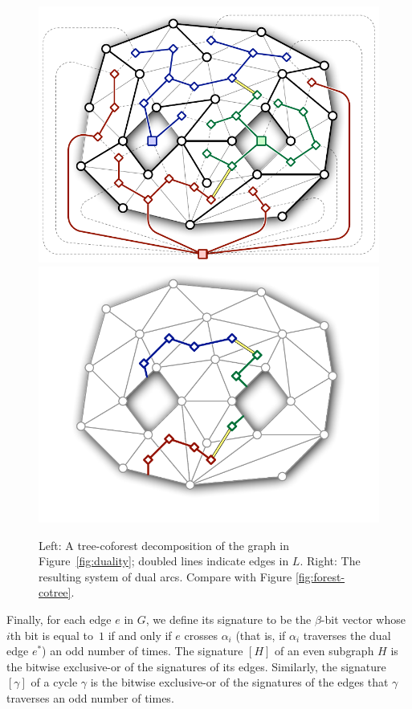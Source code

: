 \documentclass[11pt,twoside]{article}
\def\cycle{\gamma}
\def\dualarc{\alpha}
\begin{document}
\begin{figure}[htb]
\centering\footnotesize\sf
\includegraphics[scale=0.45]{Fig/tree-coforest2} \qquad
\includegraphics[scale=0.45]{Fig/tree-coforest-arcs2}
\caption{Left: A tree-coforest decomposition of the graph in Figure~\ref{fig:duality}; doubled lines indicate edges in $L$.
Right: The resulting system of dual arcs.  Compare with Figure \ref{fig:forest-cotree}.}
\label{fig:tree-coforest}
\end{figure}

Finally, for each edge $e$ in $G$, we define its signature \EMPH{$[e]$} to be the $\beta$-bit vector whose $i$th bit is equal to~$1$ if and only if $e$ crosses $\dualarc_i$ (that is, if $\dualarc_i$ traverses the dual edge $e^*$) an odd number of times. The signature $[H]$ of an even subgraph $H$ is the bitwise exclusive-or of the signatures of its edges.  Similarly, the signature~$[\cycle]$ of a cycle $\cycle$ is the bitwise exclusive-or of the signatures of the edges that $\cycle$ traverses an odd number of times.
\end{document}
